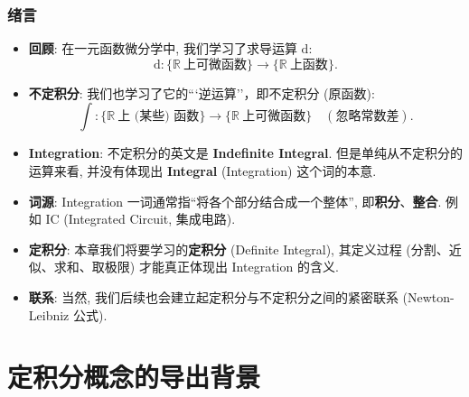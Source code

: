 \begin{frame}
\frametitle{绪言}

\begin{itemize}[<+->]
\item \textbf{回顾}: 在一元函数微分学中, 我们学习了求导运算 $\mathrm{d}$:
\[
\mathrm{d}: \{ \mathbb{R} ~ \text{上可微函数} \} \longrightarrow \{ \mathbb{R} ~ \text{上函数} \}.
\]
\item \textbf{不定积分}: 我们也学习了它的```逆运算''，即不定积分 (原函数):
\[
\int: \{ \mathbb{R} ~ \text{上 (某些) 函数} \} \longrightarrow \{ \mathbb{R} ~ \text{上可微函数} \} \quad (\text{忽略常数差}).
\]
\item \textbf{Integration}: 不定积分的英文是 \textbf{Indefinite Integral}. 但是单纯从不定积分的运算来看, 并没有体现出 \textbf{Integral} (Integration) 这个词的本意.
\item \textbf{词源}: Integration 一词通常指``将各个部分结合成一个整体'', 即\textbf{积分}、\textbf{整合}. 例如 IC (Integrated Circuit, 集成电路).
\item \textbf{定积分}: 本章我们将要学习的\textbf{定积分} (Definite Integral), 其定义过程 (分割、近似、求和、取极限) 才能真正体现出 Integration 的含义.
\item \textbf{联系}: 当然, 我们后续也会建立起定积分与不定积分之间的紧密联系 (Newton-Leibniz 公式).
\end{itemize}

\end{frame}


\section{定积分概念的导出背景}


